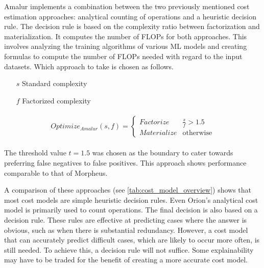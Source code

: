 Amalur \cite{schijndel_cost_estimation} implements a combination between the two previously mentioned cost estimation approaches: analytical counting of operations and a heuristic decision rule. The decision rule is based on the complexity ratio between factorization and materialization. It computes the number of FLOPs for both approaches. This involves analyzing the training algorithms of various ML models and creating formulas to compute the number of FLOPs needed with regard to the input datasets. Which approach to take is chosen as follows.

\begin{definition}

    \begin{itemize}
        \item[]
        \item[$s$] Standard complexity
        \item[$f$] Factorized complexity
    \end{itemize}

    \begin{align*}
        \begin{split}
            Optimize_{Amalur}(s, f) =
            \begin{cases}
                Factorize   & \frac{s}{f} > 1.5 \\
                Materialize & \text{otherwise}
            \end{cases}
        \end{split}
    \end{align*}
\end{definition}

The threshold value $t = 1.5 $ was chosen as the boundary to cater towards preferring false negatives to false positives. This approach shows performance comparable to that of Morpheus.

A comparison of these approaches (see \autoref{tab:cost_model_overview}) shows that most cost models are simple heuristic decision rules. Even Orion's analytical cost model is primarily used to count operations. The final decision is also based on a decision rule. These rules are effective at predicting cases where the answer is obvious, such as when there is substantial redundancy. However, a cost model that can accurately predict difficult cases, which are likely to occur more often, is still needed. To achieve this, a decision rule will not suffice. Some explainability may have to be traded for the benefit of creating a more accurate cost model.

